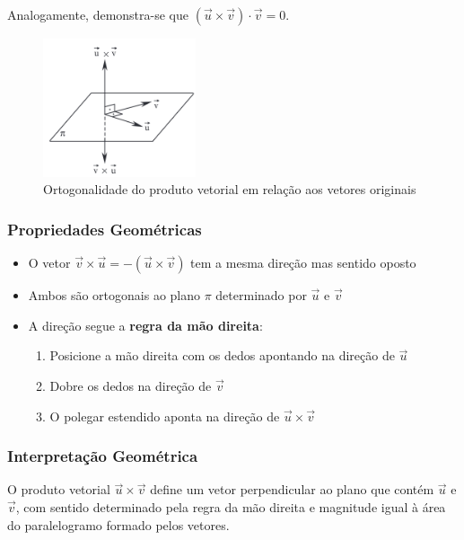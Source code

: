 Analogamente, demonstra-se que $(\vec{u} \times \vec{v}) \cdot \vec{v} = 0$.

\begin{figure}[h]
    \centering
    \includegraphics[width=0.4\textwidth]{./fig/fig3.2.png}
    \caption{Ortogonalidade do produto vetorial em relação aos vetores originais}
    \label{fig:fig3.2}
\end{figure}

\subsubsection*{Propriedades Geométricas}
\begin{itemize}
  \item O vetor $\vec{v} \times \vec{u} = -(\vec{u} \times \vec{v})$ tem a mesma direção mas sentido oposto
  \item Ambos são ortogonais ao plano $\pi$ determinado por $\vec{u}$ e $\vec{v}$
  \item A direção segue a \textbf{regra da mão direita}:
    \begin{enumerate}
      \item Posicione a mão direita com os dedos apontando na direção de $\vec{u}$
      \item Dobre os dedos na direção de $\vec{v}$
      \item O polegar estendido aponta na direção de $\vec{u} \times \vec{v}$
    \end{enumerate}
\end{itemize}

\subsubsection*{Interpretação Geométrica}
\begin{center}
\begin{minipage}{0.9\textwidth}
  O produto vetorial $\vec{u} \times \vec{v}$ define um vetor perpendicular ao
  plano que contém $\vec{u}$ e $\vec{v}$, com sentido determinado pela regra da
  mão direita e magnitude igual à área do paralelogramo formado pelos vetores.
\end{minipage}
\end{center}

